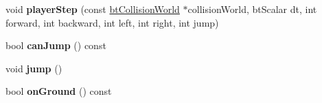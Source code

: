 \begin{DoxyCompactItemize}
\item 
\hypertarget{class_dynamic_character_controller_ae216613af71669ff5cd46f41599c656c}{void {\bfseries player\+Step} (const \hyperlink{classbt_collision_world}{bt\+Collision\+World} $\ast$collision\+World, bt\+Scalar dt, int forward, int backward, int left, int right, int jump)}\label{class_dynamic_character_controller_ae216613af71669ff5cd46f41599c656c}

\item 
\hypertarget{class_dynamic_character_controller_a7f89b9c60663222a86d8c4409da2c4ae}{bool {\bfseries can\+Jump} () const }\label{class_dynamic_character_controller_a7f89b9c60663222a86d8c4409da2c4ae}

\item 
\hypertarget{class_dynamic_character_controller_a5d3d73dd3bf1d23f8c4ad7db560745cc}{void {\bfseries jump} ()}\label{class_dynamic_character_controller_a5d3d73dd3bf1d23f8c4ad7db560745cc}

\item 
\hypertarget{class_dynamic_character_controller_a7e1e60fd8ee9b4b072bdc7c8b1f79d08}{bool {\bfseries on\+Ground} () const }\label{class_dynamic_character_controller_a7e1e60fd8ee9b4b072bdc7c8b1f79d08}

\end{DoxyCompactItemize}
